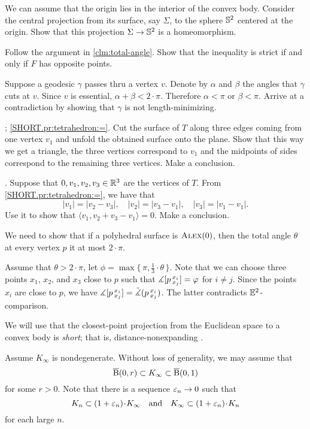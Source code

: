 We can assume that the origin lies in the interior of the convex body.
Consider the central projection from its surface, say $\Sigma$, to the sphere $\mathbb{S}^2$ centered at the origin.
Show that this projection $\Sigma\to \mathbb{S}^2$ is a homeomorphism.

Follow the argument in \ref{clm:total-angle}.
Show that the inequality is strict if and only if $F$ has opposite points.


Suppose a geodesic $\gamma$ passes thru a vertex $v$.
Denote by $\alpha$ and $\beta$ the angles that $\gamma$ cuts at $v$.
Since $v$ is essential, $\alpha+\beta<2\cdot\pi$.
Therefore $\alpha<\pi$ or $\beta<\pi$.
Arrive at a contradiction by showing that $\gamma$ is not length-minimizing.

\parbf{\ref{pr:tetrahedron}}; \ref{SHORT.pr:tetrahedron:=}.
Cut the surface of $T$ along three edges coming from one vertex $v_1$ and unfold the obtained surface onto the plane.
Show that this way we get a triangle, the three vertices correspond to $v_1$ and the midpoints of sides correspond to the remaining three vertices.
Make a conclusion.

\parit{\ref{SHORT.pr:tetrahedron:perp}}.
Suppose that $0,v_1,v_2,v_3\in\mathbb{R}^3$ are the vertices of $T$.
From \ref{SHORT.pr:tetrahedron:=}, we have that 
\[|v_1|=|v_2-v_3|,\quad |v_2|=|v_3-v_1|,\quad|v_3|=|v_1-v_1|.\]
Use it to show that $\langle v_1,v_2+v_3-v_1\rangle=0$.
Make a conclusion.

We need to show that if a polyhedral surface is $\textsc{Alex}(0)$, then the total angle $\theta$ at every vertex $p$ it at most $2\cdot\pi$.

Assume that $\theta>2\cdot\pi$,
let $\phi=\max\{\,\pi,\tfrac13\cdot\theta\,\}$.
Note that we can choose three points $x_1$, $x_2$, and $x_3$ close to $p$ such that 
$\measuredangle [p\,{}^{x_i}_{x_j}]=\varphi$ for $i\ne j$.
Since the points $x_i$ are close to $p$, we have $\measuredangle [p\,{}^{x_i}_{x_j}]=\tilde\measuredangle(p\,{}^{x_i}_{x_j})$.
The latter contradicts $\mathbb{E}^2$-comparison. 

We will use that the closest-point projection from the Euclidean space to a convex body is \emph{short};
that is, distance-nonexpanding \cite[13.3]{petrunin-zamora}.

Assume $K_\infty$ is nondegenerate.
Without loss of generality, we may assume that 
\[\overline{\mathrm{B}}{}(0,r)\subset K_\infty\subset\overline{\mathrm{B}}{}(0,1)\]
for some $r>0$.
Note that there is a sequence $\varepsilon_n\to 0$ such that 
\[ K_n\subset(1+\eps_n)\cdot K_\infty
\quad\text{and}\quad
K_\infty\subset(1+\eps_n)\cdot K_n\]
for each large $n$.

